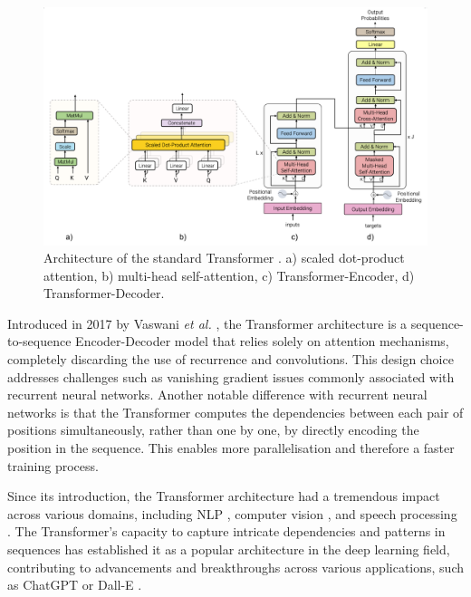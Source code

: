 \begin{figure}[h]
    \centering
    \includegraphics[width=1\textwidth]{imgs/Transformer_archi.png}
    \caption{Architecture of the standard Transformer \cite{vaswani2017attention}. a) scaled dot-product attention, b) multi-head self-attention, c) Transformer-Encoder, d) Transformer-Decoder.}
    \label{fig:Transformer_archi}
\end{figure}
Introduced in 2017 by Vaswani \textit{et al.} \cite{vaswani2017attention}, the Transformer architecture is a sequence-to-sequence Encoder-Decoder model that relies solely on attention mechanisms, completely discarding the use of recurrence and convolutions. This design choice addresses challenges such as vanishing gradient issues commonly associated with recurrent neural networks. Another notable difference with recurrent neural networks is that the Transformer computes the dependencies between each pair of positions simultaneously, rather than one by one, by directly encoding the position in the sequence. This enables more parallelisation and therefore a faster training process.

Since its introduction, the Transformer architecture had a tremendous impact across various domains, including \ac{NLP} \cite{Bert,brown2020language}, computer vision \cite{dosovitskiy2020image}, and speech processing \cite{dong2018speech}. The Transformer's capacity to capture intricate dependencies and patterns in sequences has established it as a popular architecture in the deep learning field, contributing to advancements and breakthroughs across various applications, such as ChatGPT \cite{bahrini2023chatgpt} or Dall-E \cite{ramesh2021zero}.

